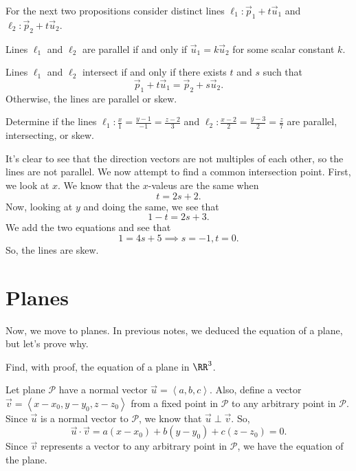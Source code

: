 For the next two propositions consider distinct lines $\ell_{1} : \vec{p}_{1} + t\vec{u}_{1}$ and $\ell_{2} : \vec{p}_{2} + t\vec{u}_{2}$.

\begin{theorem}
    Lines $\ell_{1}$ and $\ell_{2}$ are parallel if and only if $\vec{u}_{1} = k\vec{u}_{2}$ for some scalar constant $k$.
\end{theorem}

\begin{theorem}
    Lines $\ell_{1}$ and $\ell_{2}$ intersect if and only if there exists $t$ and $s$ such that
    \[\vec{p}_{1} + t\vec{u}_{1} = \vec{p}_{2} + s\vec{u}_{2}.\]
    Otherwise, the lines are parallel or skew.
\end{theorem}

\begin{example}
    Determine if the lines $\ell_{1} : \frac{x}{1} = \frac{y - 1}{-1} = \frac{z - 2}{3}$ and $\ell_{2} : \frac{x - 2}{2} = \frac{y -  3}{2} = \frac{z}{7}$ are parallel, intersecting, or skew.

    \begin{soln}
        It's clear to see that the direction vectors are not multiples of each other, so the lines are not parallel. We now attempt to find a common intersection point. First, we look at $x$. We know that the $x$-valeus are the same when
        \[t = 2s + 2.\]
        Now, looking at $y$ and doing the same, we see that
        \[1 - t = 2s + 3.\]
        We add the two equations and see that
        \[1 = 4s + 5 \implies s = -1, t = 0.\]
        So, the lines are skew.
    \end{soln}
\end{example}

\section{Planes}

Now, we move to planes. In previous notes, we deduced the equation of a plane, but let's prove why.

\begin{example}
    Find, with proof, the equation of a plane in $\RR^{3}$.

    \begin{soln}
        Let plane $\mathcal{P}$ have a normal vector $\vec{u} = \left<a, b, c\right>$. Also, define a vector $\vec{v} = \left<x - x_{0}, y - y_{0}, z - z_{0}\right>$ from a fixed point in $\mathcal{P}$ to any arbitrary point in $\mathcal{P}$. Since $\vec{u}$ is a normal vector to $\mathcal{P}$, we know that $\vec{u} \perp \vec{v}$. So,
        \[\vec{u} \cdot \vec{v} = a(x - x_{0}) + b(y - y_{0}) + c(z - z_{0}) = 0.\]
        Since $\vec{v}$ represents a vector to any arbitrary point in $\mathcal{P}$, we have the equation of the plane.
    \end{soln}
\end{example}


